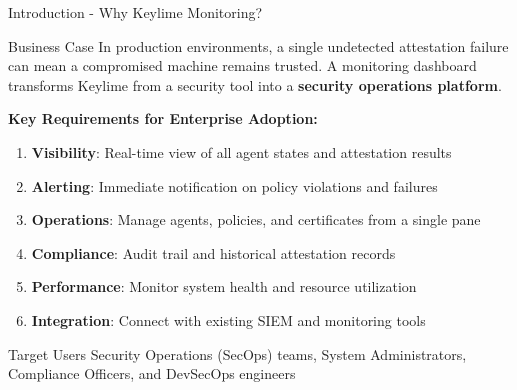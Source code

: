 \begin{frame}{Introduction - Why Keylime Monitoring?}
  \begin{alertblock}{Business Case}
    \footnotesize
    In production environments, a single undetected attestation failure
    can mean a compromised machine remains trusted. A monitoring dashboard
    transforms Keylime from a security tool into a \textbf{security operations platform}.
  \end{alertblock}

  \vspace{0.2cm}

  \textbf{Key Requirements for Enterprise Adoption:}
  \begin{enumerate}
    \item \textbf{Visibility}: Real-time view of all agent states and attestation results
    \item \textbf{Alerting}: Immediate notification on policy violations and failures
    \item \textbf{Operations}: Manage agents, policies, and certificates from a single pane
    \item \textbf{Compliance}: Audit trail and historical attestation records
    \item \textbf{Performance}: Monitor system health and resource utilization
    \item \textbf{Integration}: Connect with existing SIEM and monitoring tools
  \end{enumerate}

  \vspace{0.2cm}

  \begin{exampleblock}{Target Users}
    \scriptsize
    Security Operations (SecOps) teams, System Administrators, Compliance Officers, and DevSecOps engineers
  \end{exampleblock}
\end{frame}

